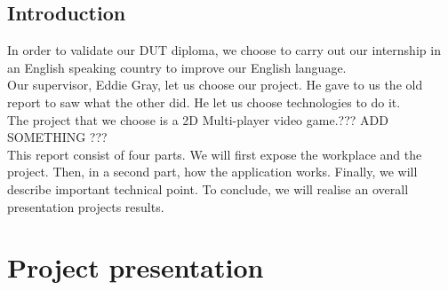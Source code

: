 \documentclass{scrreprt}
\begin{document}
		  \chapter*{Introduction} %
		  In order to validate our DUT diploma, we choose to carry out our internship in an
		  English speaking country to improve our English language.\\


		  Our supervisor, Eddie Gray, let us choose our project. He gave to us the old report to saw what the other did. He let us choose technologies to do it.\\

		  The project that we choose is a 2D Multi-player video game.??? ADD SOMETHING ???\\


		  This report consist of four parts. We will first expose the workplace and the project. Then, in a second part, how the application works. Finally, we will describe important technical point.
		  To conclude, we will realise an overall presentation projects results.\\
	

		  \renewcommand{\contentsname}{Summary}
		  \tableofcontents

		  \part{Project presentation}
\end{document}
